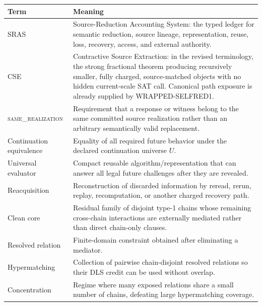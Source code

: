 \documentclass[11pt]{article}
\newcommand{\same}{\textsc{same\_realization}}
\theoremstyle{plain}
\theoremstyle{definition}
\theoremstyle{remark}
\begin{document}
\begin{longtable}{p{} p{}}
\toprule
\textbf{Term} & \textbf{Meaning}\\
\midrule
\endhead
SRAS & Source-Reduction Accounting System: the typed ledger for semantic
reduction, source lineage, representation, reuse, loss, recovery, access, and
external authority.\\
CSE & Contractive Source Extraction: in the revised terminology, the
strong fractional theorem producing recursively smaller, fully charged,
source-matched objects with no hidden current-scale SAT call.  Canonical path
exposure is already supplied by WRAPPED-SELFRED1.\\
\same & Requirement that a response or witness belong to the same committed
source realization rather than an arbitrary semantically valid replacement.\\
Continuation equivalence & Equality of all required future behavior under the
declared continuation universe $U$.\\
Universal evaluator & Compact reusable algorithm/representation that can answer
all legal future challenges after they are revealed.\\
Reacquisition & Reconstruction of discarded information by reread, rerun,
replay, recomputation, or another charged recovery path.\\
Clean core & Residual family of disjoint type-1 chains whose remaining
cross-chain interactions are externally mediated rather than direct chain-only
clauses.\\
Resolved relation & Finite-domain constraint obtained after eliminating a
mediator.\\
Hypermatching & Collection of pairwise chain-disjoint resolved relations so
their DLS credit can be used without overlap.\\
Concentration & Regime where many exposed relations share a small number of
chains, defeating large hypermatching coverage.\\
\bottomrule
\end{longtable}
\end{document}
